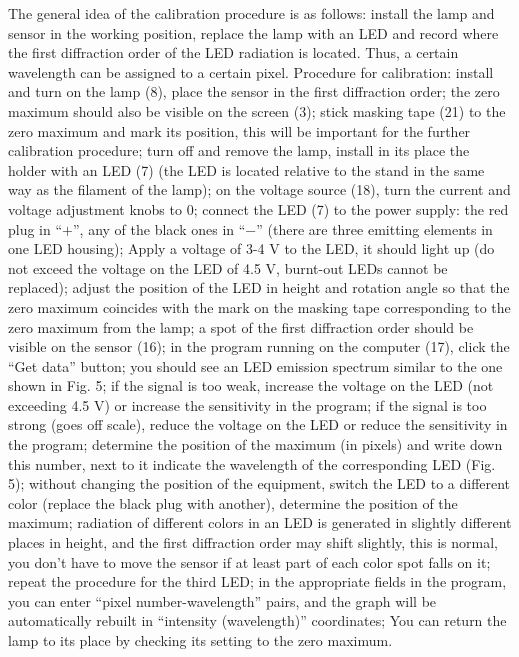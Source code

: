 \documentclass[11pt,a4paper]{article}
\begin{document}
The general idea of the calibration procedure is as follows: install the lamp and sensor in the working position, replace the lamp with an LED and record where the first diffraction order of the LED radiation is located. Thus, a certain wavelength can be assigned to a certain pixel. Procedure for calibration: install and turn on the lamp (8), place the sensor in the first diffraction order; the zero maximum should also be visible on the screen (3); stick masking tape (21) to the zero maximum and mark its position, this will be important for the further calibration procedure; turn off and remove the lamp, install in its place the holder with an LED (7) (the LED is located relative to the stand in the same way as the filament of the lamp); on the voltage source (18), turn the current and voltage adjustment knobs to 0; connect the LED (7) to the power supply: the red plug in “$+$”, any of the black ones in “$-$” (there are three emitting elements in one LED housing); Apply a voltage of 3-4 V to the LED, it should light up (do not exceed the voltage on the LED of 4.5 V, burnt-out LEDs cannot be replaced); adjust the position of the LED in height and rotation angle so that the zero maximum coincides with the mark on the masking tape corresponding to the zero maximum from the lamp; a spot of the first diffraction order should be visible on the sensor (16); in the program running on the computer (17), click the “Get data” button; you should see an LED emission spectrum similar to the one shown in Fig. 5; if the signal is too weak, increase the voltage on the LED (not exceeding 4.5 V) or increase the sensitivity in the program; if the signal is too strong (goes off scale), reduce the voltage on the LED or reduce the sensitivity in the program; determine the position of the maximum (in pixels) and write down this number, next to it indicate the wavelength of the corresponding LED (Fig. 5); without changing the position of the equipment, switch the LED to a different color (replace the black plug with another), determine the position of the maximum; radiation of different colors in an LED is generated in slightly different places in height, and the first diffraction order may shift slightly, this is normal, you don’t have to move the sensor if at least part of each color spot falls on it; repeat the procedure for the third LED; in the appropriate fields in the program, you can enter “pixel number-wavelength” pairs, and the graph will be automatically rebuilt in “intensity (wavelength)” coordinates; You can return the lamp to its place by checking its setting to the zero maximum.
\end{document}
